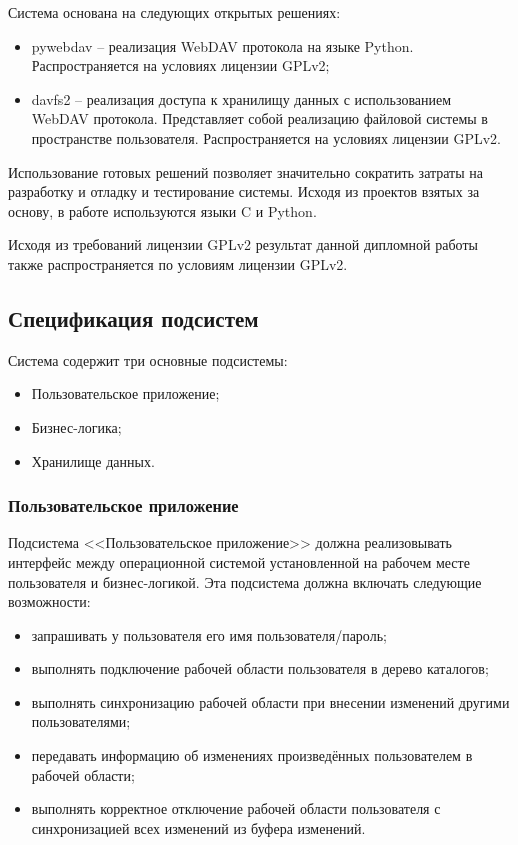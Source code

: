 \documentclass[utf8,usehyperref,12pt]{G7-32}
\begin{document}
Система основана на следующих открытых решениях:
\begin{itemize}
 \item pywebdav -- реализация WebDAV протокола на языке Python. Распространяется на условиях лицензии GPLv2;
 \item davfs2 -- реализация доступа к хранилищу данных с использованием WebDAV протокола. Представляет собой реализацию файловой системы в пространстве пользователя. Распространяется на условиях лицензии GPLv2.
\end{itemize}

Использование готовых решений позволяет значительно сократить затраты на разработку и отладку и тестирование системы. Исходя из проектов взятых за основу, в работе используются языки C\cite{c_book}\cite{stivens} и Python\cite{python_book}. 

Исходя из требований лицензии GPLv2 результат данной дипломной работы также распространяется по условиям лицензии GPLv2.

\subsection{Спецификация подсистем}\label{ssect_subsys}

Система содержит три основные подсистемы:
\begin{itemize}
 \item Пользовательское приложение;
 \item Бизнес-логика;
 \item Хранилище данных.
\end{itemize}

\subsubsection{Пользовательское приложение}

Подсистема <<Пользовательское приложение>> должна реализовывать интерфейс между операционной системой установленной на рабочем месте пользователя и бизнес-логикой. Эта подсистема должна включать следующие возможности:
\begin{itemize}
 \item запрашивать у пользователя его имя пользователя/пароль;
 \item выполнять подключение рабочей области пользователя в дерево каталогов;
 \item выполнять синхронизацию рабочей области при внесении изменений другими пользователями;
 \item передавать информацию об изменениях произведённых пользователем в рабочей области;
 \item выполнять корректное отключение рабочей области пользователя с синхронизацией всех изменений из буфера изменений.
\end{itemize}
\end{document}
